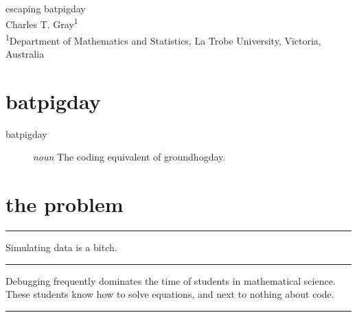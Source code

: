 \documentclass[article,30pt,extrafontsizes]{memoir}
\begin{document}
\begin{topbox}
  \color{titletextcol}
  \vspace{0.5in}
  \Huge{\selectfont escaping batpigday}  \\[0.3in]  %
  \color{authortextcol} \Large{Charles T. Gray\textsuperscript{1}} \\[0.2in] %
  \color{affiliationtextcol} \large{\textsuperscript{1}Department of Mathematics and Statistics, La Trobe
University, Victoria, Australia} %
  \vspace{1cm}
\end{topbox}
\begin{adjmulticols*}{3}{0.5in}{0.5in}
\normalsize{  %
\color{bodytextcol}
\hypertarget{batpigday}{%
\section{batpigday}\label{batpigday}}

\begin{description}
  \item[batpigday]{\emph{noun} The coding equivalent of groundhogday.}
\end{description}

\hypertarget{the-problem}{%
\section{the problem}\label{the-problem}}

\begin{center}\rule{0.5\linewidth}{\linethickness}\end{center}

\begin{center}
Simulating data is a bitch. 
\end{center}

\begin{center}\rule{0.5\linewidth}{\linethickness}\end{center}

Debugging frequently dominates the time of students in mathematical
science. These students know how to solve equations, and next to nothing
about code.

\begin{center}\rule{0.5\linewidth}{\linethickness}\end{center}

}
\end{adjmulticols*}
\end{document}
